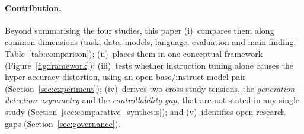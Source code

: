 \paragraph{Contribution.} Beyond summarising the four studies, this paper (i)~compares them along common dimensions (task, data, models, language, evaluation and main finding; Table~\ref{tab:comparison}); (ii)~places them in one conceptual framework (Figure~\ref{fig:framework}); (iii)~tests whether instruction tuning alone causes the hyper-accuracy distortion, using an open base/instruct model pair (Section~\ref{sec:experiment}); (iv)~derives two cross-study tensions, the \emph{generation--detection asymmetry} and the \emph{controllability gap}, that are not stated in any single study (Section~\ref{sec:comparative_synthesis}); and (v)~identifies open research gaps (Section~\ref{sec:governance}).
